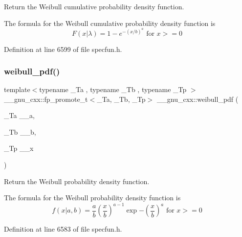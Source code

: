 Return the Weibull cumulative probability density function. 

The formula for the Weibull cumulative probability density function is \[ F(x|\lambda) = 1 - e^{-(x / b)^a} \mbox{ for } x >= 0 \] 

Definition at line 6599 of file specfun.\+h.

\mbox{\label{group__gnu__math__spec__func_gacfbb6ca9df8e0aa092ff4406baff597c}} 
\subsubsection{\texorpdfstring{weibull\+\_\+pdf()}{weibull\_pdf()}}
{\footnotesize\ttfamily template$<$typename \+\_\+\+Ta , typename \+\_\+\+Tb , typename \+\_\+\+Tp $>$ \\
\+\_\+\+\_\+gnu\+\_\+cxx\+::fp\+\_\+promote\+\_\+t$<$\+\_\+\+Ta, \+\_\+\+Tb, \+\_\+\+Tp$>$ \+\_\+\+\_\+gnu\+\_\+cxx\+::weibull\+\_\+pdf (\begin{DoxyParamCaption}\item[{\+\_\+\+Ta}]{\+\_\+\+\_\+a,  }\item[{\+\_\+\+Tb}]{\+\_\+\+\_\+b,  }\item[{\+\_\+\+Tp}]{\+\_\+\+\_\+x }\end{DoxyParamCaption})\hspace{0.3cm}{\ttfamily [inline]}}



Return the Weibull probability density function. 

The formula for the Weibull probability density function is \[ f(x | a, b) = \frac{a}{b} \left(\frac{x}{b} \right)^{a-1} \exp{-\left(\frac{x}{b}\right)^a} \mbox{ for } x >= 0 \] 

Definition at line 6583 of file specfun.\+h.

\mbox{\label{group__gnu__math__spec__func_gaaed33f29c1eb1d2c5b9590fe2e57151c}} 
